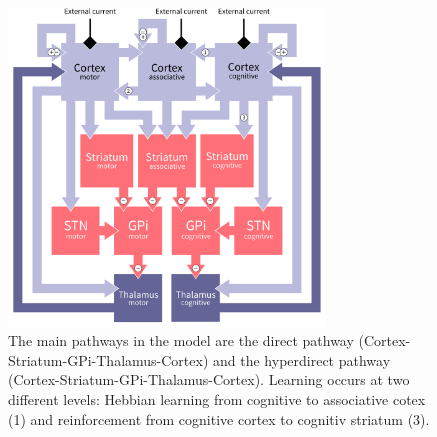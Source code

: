 
\begin{figure}[h]
  \centering \includegraphics[width=0.75\textwidth]{architecture}
  \caption{The main pathways in the model are the direct pathway
    (Cortex-Striatum-GPi-Thalamus-Cortex) and the hyperdirect pathway
    (Cortex-Striatum-GPi-Thalamus-Cortex). Learning occurs at two different
    levels: Hebbian learning from cognitive to associative cotex (1) and
    reinforcement from cognitive cortex to cognitiv striatum (3).}
  \label{fig:architecture}
\end{figure}



